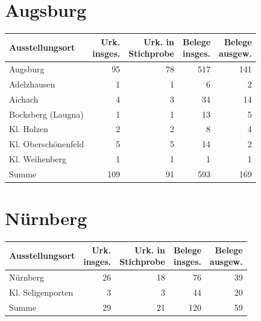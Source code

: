 \section{Augsburg}

\begin{tabularx}{\linewidth}{X r r r r}
\toprule
Ausstellungsort
	& \makecell{Urk.\\ insges.}
	& \makecell{Urk. in\\ Stichprobe}
	& \makecell{Belege\\ insges.}
	& \makecell{Belege\\ ausgew.}
	\\
\midrule

Augsburg
	& 95
	& 78
	& 517
	& 141
	\\

Adelzhausen
	& 1
	& 1
	& 6
	& 2
	\\

Aichach
	& 4
	& 3
	& 34
	& 14
	\\

Bocksberg (Laugna)
	& 1
	& 1
	& 13
	& 5
	\\

Kl. Holzen
	& 2
	& 2
	& 8
	& 4
	\\

Kl. Oberschönenfeld
	& 5
	& 5
	& 14
	& 2
	\\

Kl. Weihenberg
	& 1
	& 1
	& 1
	& 1
	\\

\midrule

Summe
	& 109
	& 91
	& 593
	& 169
	\\

\bottomrule
\end{tabularx}

\section{Nürnberg}

\begin{tabularx}{\linewidth}{X r r r r}
\toprule
Ausstellungsort
	& \makecell{Urk.\\ insges.}
	& \makecell{Urk. in\\ Stichprobe}
	& \makecell{Belege\\ insges.}
	& \makecell{Belege\\ ausgew.}
	\\
\midrule

Nürnberg
	& 26
	& 18
	& 76
	& 39
	\\

Kl. Seligenporten
	& 3
	& 3
	& 44
	& 20
	\\

\midrule

Summe
	& 29
	& 21
	& 120
	& 59
	\\

\bottomrule
\end{tabularx}

